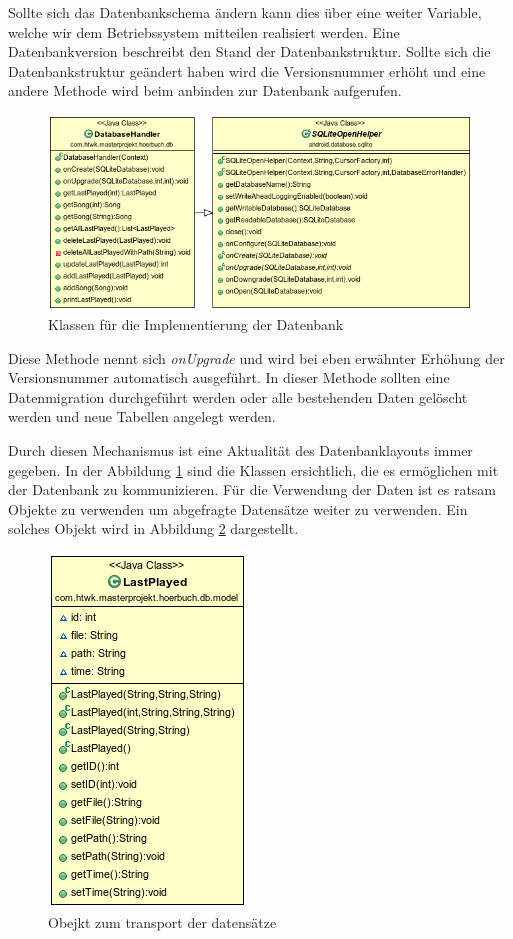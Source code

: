Sollte sich das Datenbankschema ändern kann dies über eine weiter Variable, welche wir dem Betriebssystem mitteilen realisiert werden. Eine Datenbankversion beschreibt den Stand der Datenbankstruktur. Sollte sich die Datenbankstruktur geändert haben wird die Versionsnummer erhöht und eine andere Methode wird beim anbinden zur Datenbank aufgerufen.


\begin{figure}
\begin{center}
\includegraphics[scale=0.7]{images/database}
\caption{Klassen für die Implementierung der Datenbank}
\label{database}
\end{center}
\end{figure}


Diese Methode nennt sich \textit{onUpgrade} und wird bei eben erwähnter Erhöhung der Versionsnummer automatisch ausgeführt. In dieser Methode sollten eine Datenmigration durchgeführt werden oder alle bestehenden Daten gelöscht werden und neue Tabellen angelegt werden.

Durch diesen Mechanismus ist eine Aktualität des Datenbanklayouts immer gegeben. In der Abbildung \ref{database} sind die Klassen ersichtlich, die es ermöglichen mit der Datenbank zu kommunizieren. Für die Verwendung der Daten ist es ratsam Objekte zu verwenden um abgefragte Datensätze weiter zu verwenden. Ein solches Objekt wird in Abbildung \ref{dbmodel} dargestellt.

\begin{figure}
\begin{center}
\includegraphics[scale=0.7]{images/dbmodel}
\caption{Obejkt zum transport der datensätze}
\label{dbmodel}
\end{center}
\end{figure}

